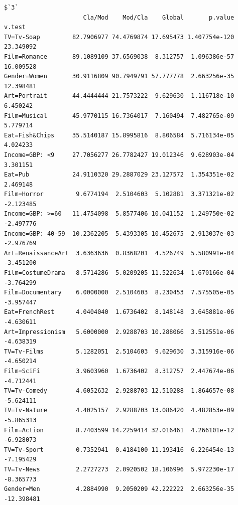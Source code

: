 \documentclass[
  letterpaper,
  DIV=11,
  numbers=noendperiod]{scrartcl}
\begin{document}
\begin{verbatim}
$`3`
                      Cla/Mod    Mod/Cla    Global       p.value     v.test
TV=Tv-Soap         82.7906977 74.4769874 17.695473 1.407754e-120  23.349092
Film=Romance       89.1089109 37.6569038  8.312757  1.096386e-57  16.009528
Gender=Women       30.9116809 90.7949791 57.777778  2.663256e-35  12.398481
Art=Portrait       44.4444444 21.7573222  9.629630  1.116718e-10   6.450242
Film=Musical       45.9770115 16.7364017  7.160494  7.482765e-09   5.779714
Eat=Fish&Chips     35.5140187 15.8995816  8.806584  5.716134e-05   4.024233
Income=GBP: <9     27.7056277 26.7782427 19.012346  9.628903e-04   3.301151
Eat=Pub            24.9110320 29.2887029 23.127572  1.354351e-02   2.469148
Film=Horror         9.6774194  2.5104603  5.102881  3.371321e-02  -2.123485
Income=GBP: >=60   11.4754098  5.8577406 10.041152  1.249750e-02  -2.497776
Income=GBP: 40-59  10.2362205  5.4393305 10.452675  2.913037e-03  -2.976769
Art=RenaissanceArt  3.6363636  0.8368201  4.526749  5.580991e-04  -3.451200
Film=CostumeDrama   8.5714286  5.0209205 11.522634  1.670166e-04  -3.764299
Film=Documentary    6.0000000  2.5104603  8.230453  7.575505e-05  -3.957447
Eat=FrenchRest      4.0404040  1.6736402  8.148148  3.645881e-06  -4.630611
Art=Impressionism   5.6000000  2.9288703 10.288066  3.512551e-06  -4.638319
TV=Tv-Films         5.1282051  2.5104603  9.629630  3.315916e-06  -4.650214
Film=SciFi          3.9603960  1.6736402  8.312757  2.447674e-06  -4.712441
TV=Tv-Comedy        4.6052632  2.9288703 12.510288  1.864657e-08  -5.624111
TV=Tv-Nature        4.4025157  2.9288703 13.086420  4.482853e-09  -5.865313
Film=Action         8.7403599 14.2259414 32.016461  4.266101e-12  -6.928073
TV=Tv-Sport         0.7352941  0.4184100 11.193416  6.226454e-13  -7.195429
TV=Tv-News          2.2727273  2.0920502 18.106996  5.972230e-17  -8.365773
Gender=Men          4.2884990  9.2050209 42.222222  2.663256e-35 -12.398481


\end{verbatim}
\end{document}
